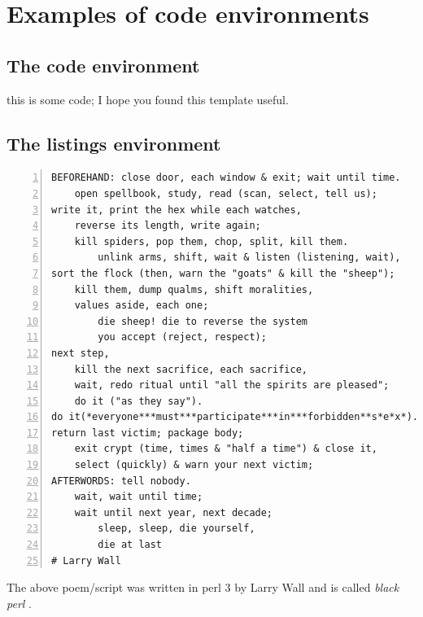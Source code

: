 \chapter{Examples of code environments}

\section{The code environment}

\begin{code}
this is some code;
I hope you found this template useful.
\end{code}

\section{The listings environment}

\begin{minipage}{\textwidth}
\begin{lstlisting}[numbers=left]
BEFOREHAND: close door, each window & exit; wait until time.
    open spellbook, study, read (scan, select, tell us);
write it, print the hex while each watches,
    reverse its length, write again;
    kill spiders, pop them, chop, split, kill them.
        unlink arms, shift, wait & listen (listening, wait),
sort the flock (then, warn the "goats" & kill the "sheep");
    kill them, dump qualms, shift moralities,
    values aside, each one;
        die sheep! die to reverse the system
        you accept (reject, respect);
next step,
    kill the next sacrifice, each sacrifice,
    wait, redo ritual until "all the spirits are pleased";
    do it ("as they say").
do it(*everyone***must***participate***in***forbidden**s*e*x*).
return last victim; package body;
    exit crypt (time, times & "half a time") & close it,
    select (quickly) & warn your next victim;
AFTERWORDS: tell nobody.
    wait, wait until time;
    wait until next year, next decade;
        sleep, sleep, die yourself,
        die at last
# Larry Wall
\end{lstlisting}
\end{minipage}

The above poem/script was written in perl 3 by Larry Wall and is called \textit{black perl} \cite{blackPerl}.

